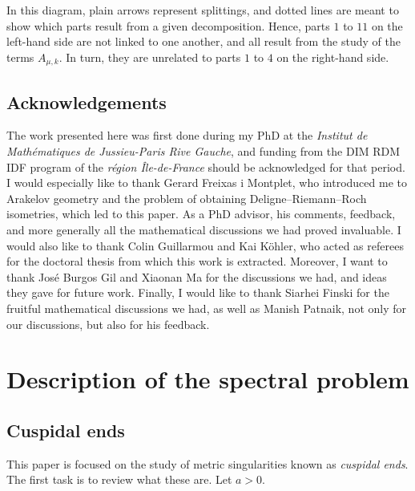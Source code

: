 \documentclass{jams-l}
\theoremstyle{definition}
\theoremstyle{remark}
\numberwithin{equation}{section}
\begin{document}
        \noindent In this diagram, plain arrows represent splittings, and dotted lines are meant to show which parts result from a given decomposition. Hence, parts $1$ to $11$ on the left-hand side are not linked to one another, and all result from the study of the terms $A_{\mu,k}$. In turn, they are unrelated to parts $1$ to $4$ on the right-hand side.
            
    
    
    \subsection{Acknowledgements}
    
        The work presented here was first done during my PhD at the \textit{Institut de Mathématiques de Jussieu-Paris Rive Gauche}, and funding from the DIM RDM IDF program of the \textit{région Île-de-France} should be acknowledged for that period. I would especially like to thank Gerard Freixas i Montplet, who introduced me to Arakelov geometry and the problem of obtaining Deligne--Riemann--Roch isometries, which led to this paper. As a PhD advisor, his comments, feedback, and more generally all the mathematical discussions we had proved invaluable. I would also like to thank Colin Guillarmou and Kai Köhler, who acted as referees for the doctoral thesis from which this work is extracted. Moreover, I want to thank José Burgos Gil and Xiaonan Ma for the discussions we had, and ideas they gave for future work. Finally, I would like to thank Siarhei Finski for the fruitful mathematical discussions we had, as well as Manish Patnaik, not only for our discussions, but also for his feedback.



\section{Description of the spectral problem}
\label{SecDescriptionSpectralProblem}

    \subsection{Cuspidal ends}
    \label{SubSecCuspidalEnds}
    
        This paper is focused on the study of metric singularities known as \textit{cuspidal ends}. The first task is to review what these are. Let $a > 0$.
        
\end{document}
